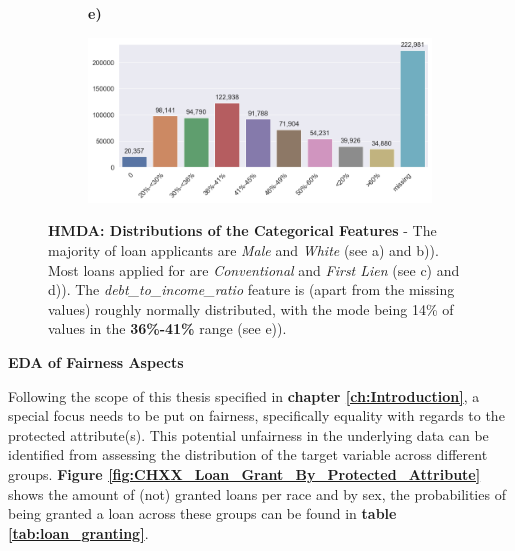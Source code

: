\begin{figure}[!htbp]
\begin{minipage}[b]{0.5\textwidth}
\begin{subfigure}[t]{0.9\textwidth}
        \end{subfigure}
    \end{minipage}%
    \hfill\allowbreak%
    \begin{minipage}[b]{1\textwidth}
        \centering
        \begin{subfigure}[t]{0.06\textwidth}
            \textbf{e)}
        \end{subfigure}
        \begin{subfigure}[t]{0.92\textwidth}
            \includegraphics[width=\linewidth, valign=t]{images/HMDA_features/HMDA_features_dtir.png}
        \end{subfigure}
    \end{minipage}%

    \caption[HMDA: Distributions of the Categorical Features]{\textbf{HMDA: Distributions of the Categorical Features} - The majority of loan applicants are \textit{Male} and \textit{White} (see a) and b)). 
    Most loans applied for are \textit{Conventional} and \textit{First Lien} (see c) and d)). The \textit{debt\_to\_income\_ratio} feature is (apart from the missing values) roughly normally distributed, with the mode being 14\% of values in the \textbf{36\%-41\%} range (see e)).}
    \label{fig:HMDA_Categorical_Features_Distributions}

\end{figure}

  



\textbf{EDA of Fairness Aspects}

Following the scope of this thesis specified in \textbf{chapter \ref{ch:Introduction}}, a special focus needs to be put  on fairness, specifically equality with regards to the protected attribute(s).
This potential unfairness in the underlying data can be identified from assessing the distribution of the target variable across different groups.
\textbf{Figure \ref{fig:CHXX_Loan_Grant_By_Protected_Attribute}} shows the amount of (not) granted loans per race and by sex, the probabilities of being granted a loan across these groups can be found in \textbf{table \ref{tab:loan_granting}}.\@

